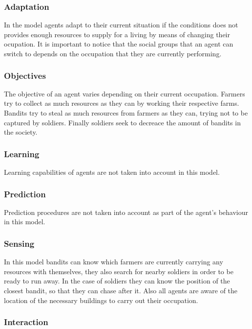 \documentclass{wscpaperproc}
\begin{document}
\subsubsection{Adaptation}

In the model agents adapt to their current situation if the conditions does not
provides enough resources to supply for a living by means of changing their
ocupation. It is important to notice that the social groups that an agent can
switch to depends on the occupation that they are currently performing.

\subsubsection{Objectives}

The objective of an agent varies depending on their current occupation. Farmers
try to collect as much resources as they can by working their respective farms.
Bandits try to steal as much resources from farmers as they can, trying not to
be captured by soldiers. Finally soldiers seek to decreace the amount of
bandits in the society.

\subsubsection{Learning}

Learning capabilities of agents are not taken into account in this model.

\subsubsection{Prediction}

Prediction procedures are not taken into account as part of the agent's
behaviour in this model.

\subsubsection{Sensing}

In this model bandits can know which farmers are currently carrying any resources
with themselves, they also search for nearby soldiers in order to be ready to
run away. In the case of soldiers they can know the position of the closest
bandit, so that they can chase after it. Also all agents are aware of the
location of the necessary buildings to carry out their occupation.

\subsubsection{Interaction}
\end{document}
